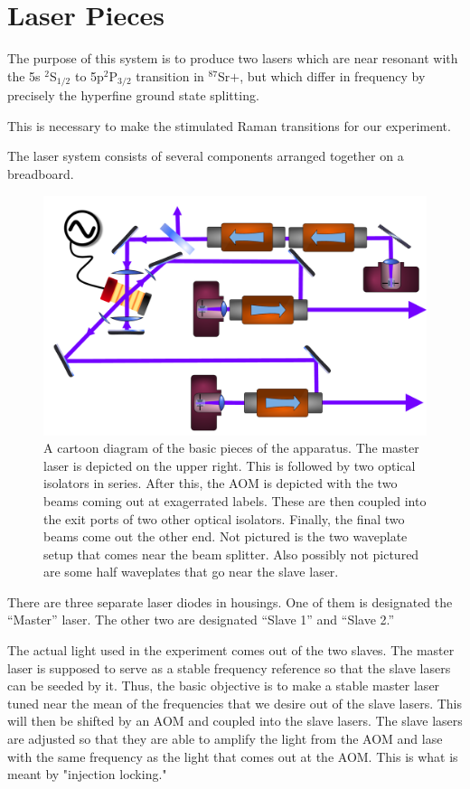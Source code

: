 \chapter{Laser Pieces}


The purpose of this system is to produce two lasers which are near resonant with the 5s $^2$S$_{1/2}$ to 5p$^2$P$_{3/2}$ transition in $^{87}$Sr$+$, but which differ in frequency by precisely the hyperfine ground state splitting. 

This is necessary to make the stimulated Raman transitions for our experiment. 

The laser system consists of several components arranged together on a breadboard. 

\begin{figure}
    \centerline{\includegraphics[width=1\textwidth]{diagramOfSetup3}}
    \caption[Diagram of the Setup]{\label{figdiagramOfSetup}
	A cartoon diagram of the basic pieces of the apparatus. The master laser is depicted on the upper right. This is followed by two optical isolators in series. After this, the AOM is depicted with the two beams coming out at exagerrated labels. These are then coupled into the exit ports of two other optical isolators. Finally, the final two beams come out the other end. Not pictured is the two waveplate setup that comes near the beam splitter. Also possibly not pictured are some half waveplates that go near the slave laser. 
    }
\end{figure}


There are three separate laser diodes in housings. One of them is designated the ``Master'' laser. The other two are designated ``Slave 1'' and ``Slave 2.'' 

The actual light used in the experiment comes out of the two slaves. The master laser is supposed to serve as a stable frequency reference so that the slave lasers can be seeded by it. Thus, the basic objective is to make a stable master laser tuned near the mean of the frequencies that we desire out of the slave lasers. This will then be shifted by an AOM and coupled into the slave lasers. The slave lasers are adjusted so that they are able to amplify the light from the AOM and lase with the same frequency as the light that comes out at the AOM. This is what is meant by "injection locking."

